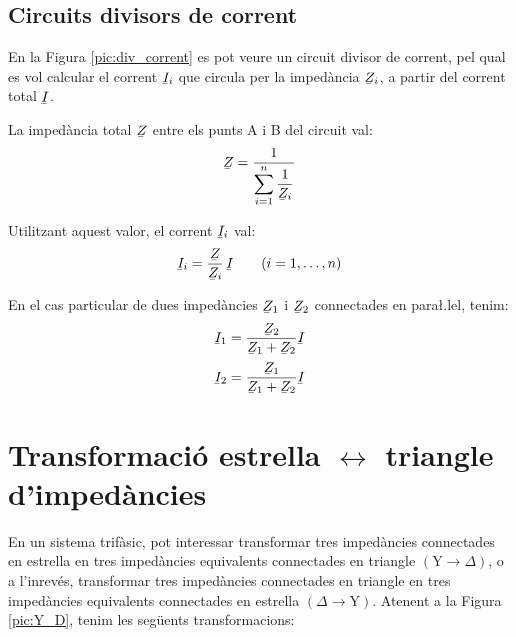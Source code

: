 \subsection{Circuits divisors de corrent}\label{sec:circ-div-corr}

En la Figura \vref{pic:div_corrent} es pot veure un circuit divisor
de corrent, pel qual es vol calcular el corrent $\cmplx{I}_i$ que
circula per la imped\`{a}ncia $\cmplx{Z}_i$, a partir del corrent total
$\cmplx{I}$.
\begin{center}
\centering
    
    \label{pic:div_corrent}
\end{center}

La imped\`{a}ncia total $\cmplx{Z}$ entre els punts A i B del circuit val:
\begin{equation}
    \cmplx{Z} = \frac{1}{\displaystyle\sum_{i=1}^n \frac{1}{\cmplx{Z}_i}}
\end{equation}

Utilitzant aquest valor, el corrent $\cmplx{I}_i$ val:
\begin{equation}
    \cmplx{I}_i = \frac{\cmplx{Z}}{\cmplx{Z}_i}\,\cmplx{I} \qquad (i=1,\dots,n)\label{eq:div_corrent}
\end{equation}

En el cas particular de dues imped\`{a}ncies $\cmplx{Z}_1$ i $\cmplx{Z}_2$ connectades en para{\l.l}el, tenim:
\begin{subequations}
\begin{align}
    \cmplx{I}_1 &= \frac{\cmplx{Z}_2}{\cmplx{Z}_1+\cmplx{Z}_2} \cmplx{I}  \\[0.5ex]
    \cmplx{I}_2 &= \frac{\cmplx{Z}_1}{\cmplx{Z}_1+\cmplx{Z}_2} \cmplx{I}
\end{align}
\end{subequations}


\section{\texorpdfstring{Transformaci\'{o} estrella $\boldsymbol{\leftrightarrow}$ triangle d'imped\`{a}ncies}
    {Transformaci\'{o} estrella-triangle d'imped\`{a}ncies}}\label{secc:d_y} 

En un sistema trif\`{a}sic, pot interessar transformar tres imped\`{a}ncies connectades en
estrella en tres imped\`{a}ncies equivalents connectades en triangle
$(\text{Y}\rightarrow\Delta)$, o a l'inrev\'{e}s, transformar tres imped\`{a}ncies connectades en
triangle en tres imped\`{a}ncies equivalents connectades en estrella
$(\Delta\rightarrow\text{Y})$. Atenent a la Figura \vref{pic:Y_D}, tenim les seg\"{u}ents
transformacions:

